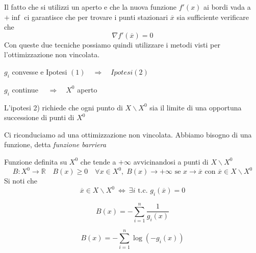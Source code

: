   Il fatto che si utilizzi un aperto e che la nuova funzione $f'(x)$ ai bordi vada a $+\inf$ ci garantisce che per trovare i punti stazionari $\overline{x}$ sia sufficiente verificare che
 $$ \nabla f'(\overline{x}) = 0$$
 Con queste due tecniche possiamo quindi utilizzare i metodi visti per l'ottimizzazione non vincolata.
 

\begin{observation}
  $ g_i$ convesse e Ipotesi $(1) \quad 
\Rightarrow \quad  Ipotesi (2)$
\end{observation}

\begin{observation}
$g_i$ continue $ \quad \Rightarrow \quad X^{0}  $ aperto
\end{observation}
L'ipotesi 2) richiede che ogni punto di $X \backslash X^{0}$ sia
il limite di una opportuna successione di punti di $X^{0}$

Ci riconduciamo ad una ottimizzazione non vincolata.
Abbiamo bisogno di una funzione, detta \emph{funzione barriera}

\begin{defn}
Funzione definita su $X^{0}$ che tende a $+ \infty$  avvicinandosi
a punti di $X\backslash X^{0}$
$$ B:X^{0} \rightarrow \mathbb{R} \quad
B(x)\geq 0 \quad \forall x \in X^{0},
\; B(x) \to +\infty \text{ se } x \rightarrow \overline{x}
\text{ con } \overline{x} \in X\backslash X^{0}
$$
Si noti che 
$$\overline{x} \in X\backslash X^{0} ~ \Longleftrightarrow ~ \exists i \text{ t.c. } g_i(\overline{x}) = 0$$
\end{defn}

\begin{defn}
$$ B(x) = - \displaystyle \sum_{i=1}^{n} \dfrac{1}{g_i(x)} $$
\end{defn}

\begin{defn}
$$ B(x) = - \displaystyle \sum_{i=1}^{n} \log(-g_i(x)) $$
\end{defn}

